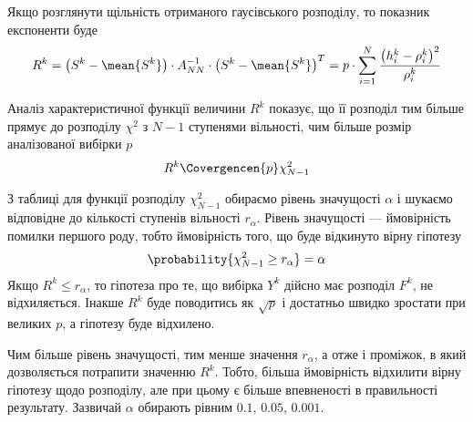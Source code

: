 Якщо розглянути щільність отриманого гаусівського розподілу, то показник
експоненти буде
\begin{equation*}
  R^k
  = \left( S^k - \mean{S^k} \right) \cdot A_{NN}^{-1}
      \cdot \left( S^k - \mean{S^k} \right)^T
  = p \cdot \sum_{i=1}^{N}\frac{\left( h_i^k - \rho_i^k \right)^2}{\rho_i^k}
\end{equation*}
\begin{comment}
Маємо суму $p$ квадратів \textbf{залежних} між собою випадкових величин, що
приблизно мають стандартний гаусовський розподіл.
Хотілося б мати розподіл суми квадратів \textbf{незалежних} стандартних
гаусовських випадкових величин --- розподіл Пірсона $\chi^2$.
Виявляється, що залежність отриманих випадкових величин
забирає лише один ступінь вільності, і на виході отримуємо розподіл Пірсона з
$N-1$ ступенями вільності \cite{Hudson:1963}
\end{comment}
Аналіз характеристичної функції величини $R^k$ показує, що її розподіл тим
більше прямує до розподілу $\chi^2$ з $N-1$ ступенями вільності, чим більше
розмір аналізованої вибірки $p$
\begin{equation*}
  R^k \Covergencen{p} \chi_{N-1}^2
\end{equation*}

З таблиці для функції розподілу $\chi_{N-1}^2$ обираємо рівень значущості
$\alpha$ і шукаємо відповідне до кількості ступенів вільності $r_{\alpha}$.
Рівень значущості --- ймовірність помилки першого роду, тобто ймовірність того,
що буде відкинуто вірну гіпотезу
\begin{equation*}
  \probability{\chi_{N-1}^2 \ge r_{\alpha}} = \alpha
\end{equation*}
Якщо $R^k \le r_{\alpha}$, то гіпотеза про те, що вибірка $Y^k$ дійсно має
розподіл $F^k$, не відхиляється. Інакше $R^k$ буде поводитись як $\sqrt{p}$
і достатньо швидко зростати при великих $p$, а гіпотезу буде відхилено.

Чим більше рівень значущості, тим менше значення $r_{\alpha}$, а отже і
проміжок, в який дозволяється потрапити значенню $R^k$.
Тобто, більша ймовірність відхилити вірну гіпотезу щодо розподілу,
але при цьому є більше впевненості в правильності результату.
Зазвичай $\alpha$ обирають рівним $0.1$, $0.05$, $0.001$.
